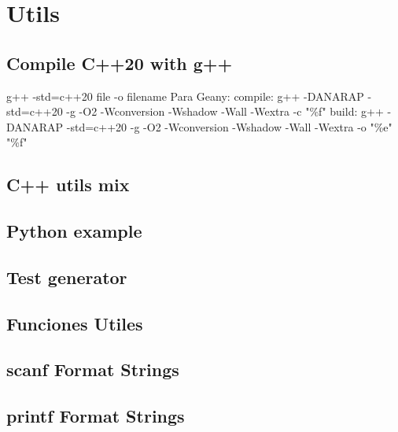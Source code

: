 \section{Utils}

\subsection{Compile C++20 with g++}
\begin{code}
g++ -std=c++20 {file} -o {filename}
Para Geany:
compile: g++ -DANARAP -std=c++20 -g -O2 -Wconversion -Wshadow -Wall -Wextra -c "\%f"
build:   g++ -DANARAP -std=c++20 -g -O2 -Wconversion -Wshadow -Wall -Wextra -o "\%e" "\%f"
\end{code}

\subsection{C++ utils mix}


\subsection{Python example}


\subsection{Test generator}


\subsection{Funciones Utiles}

\subsection{scanf Format Strings}

\subsection{printf Format Strings}


%
